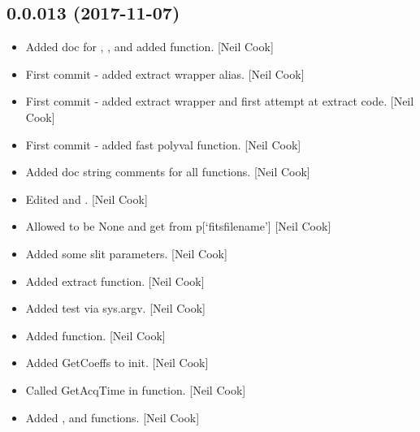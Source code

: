 \documentclass[a4paper,10pt,english]{report}
\begin{document}
\subsection{0.0.013 (2017-11-07)}
\label{\detokenize{misc/changelog:id538}}\begin{itemize}
\item {} 
Added doc for , ,
 and  added
 function. {[}Neil Cook{]}

\item {} 
First commit - added extract wrapper alias. {[}Neil Cook{]}

\item {} 
First commit - added extract wrapper and first attempt at extract
code. {[}Neil Cook{]}

\item {} 
First commit - added fast polyval function. {[}Neil Cook{]}

\item {} 
Added doc string comments for all functions. {[}Neil Cook{]}

\item {} 
Edited  and . {[}Neil Cook{]}

\item {} 
Allowed  to be None and get  from p{[}‘fitsfilename’{]}
{[}Neil Cook{]}

\item {} 
Added some slit parameters. {[}Neil Cook{]}

\item {} 
Added extract function. {[}Neil Cook{]}

\item {} 
Added test via sys.argv. {[}Neil Cook{]}

\item {} 
Added  function. {[}Neil Cook{]}

\item {} 
Added GetCoeffs to init. {[}Neil Cook{]}

\item {} 
Called GetAcqTime in  function. {[}Neil Cook{]}

\item {} 
Added ,  and  functions. {[}Neil
Cook{]}


\end{itemize}
\end{document}
